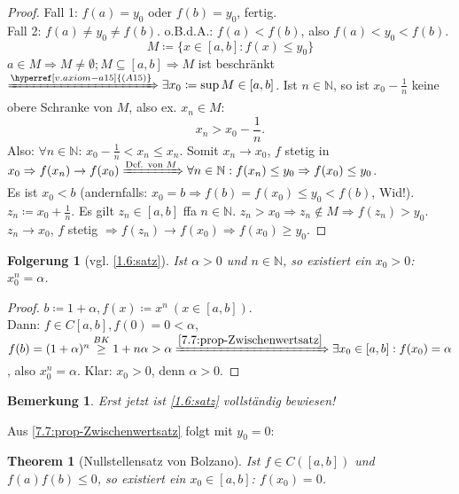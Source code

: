 \documentclass[titlepage,ngerman,a4paper,headsepline]{scrartcl}
\newcommand{\N}{\mathbb{N}}
\theoremstyle{named}
\newtheorem{namedtheorem}{Theorem} \counterwithin{namedtheorem}{section}
\theoremstyle{dotless}
\newtheorem*{bemerkung}{Bemerkung}
\newtheorem*{folgerung*}{Folgerung}
\begin{document}
\begin{proof}
	Fall 1: $f(a) = y_{0}$ oder $f(b) = y_{0}$, fertig. \\
	Fall 2: $f(a) \neq y_{0} \neq f(b)$. o.B.d.A.: $f(a) < f(b)$, also $f(a) < y_{0} < 	f(b)$.
	$$ M \coloneqq \{ x \in [a, b]: f(x) \leq y_{0} \} $$
	$a \in M \Rightarrow M \neq \emptyset; M \subseteq [a, b] \Rightarrow M$ ist beschränkt $\xRightarrow[]{\hyperref[v.axiom-a15]{(A15)}} \exists x_{0} \coloneqq \sup M \in [a, b]$. Ist $n \in \N$, so ist $x_{0} - \frac{1}{n}$ keine obere Schranke von $M$, also ex. $x_{n} \in M$:
		$$ x_{n} > x_{0} - \frac{1}{n}. $$
	Also: $\forall n \in \N$: $x_{0} - \frac{1}{n} < x_{n} \leq x_{n}$. Somit $x_{n} \rightarrow x_{0}$, $f$ stetig in $x_{0} \Rightarrow f(x_{n}) \rightarrow f(x_{0}) \xRightarrow[]{\text{Def. von }M} \forall n \in \N: f(x_{n}) \leq y_{0} \Rightarrow f(x_{0}) \leq y_{0}$. \\
	Es ist $x_{0} < b$ (andernfalls: $x_{0} = b \Rightarrow f(b) = f(x_{0}) \leq y_{0} < f(b)$, Wid!). \\
	$z_{n} \coloneqq x_{0} + \frac{1}{n}$. Es gilt $z_{n} \in [a, b]$ ffa $n \in \N$. $z_{n} > x_{0} \Rightarrow z_{n} \notin M \Rightarrow f(z_{n}) > y_{0}$. $z_{n} \rightarrow x_{0}$, $f$ stetig $\Rightarrow f(z_{n}) \rightarrow f(x_{0}) \Rightarrow f(x_{0}) \geq y_{0}$.
\end{proof}


\begin{folgerung*}[vgl. \ref{1.6:satz}]
	Ist $\alpha > 0$ und $n \in \N$, so existiert ein $x_{0} > 0$: $x_{0}^{n} = \alpha$.	
\end{folgerung*}

\begin{proof}
	$b \coloneqq 1 + \alpha, f(x) \coloneqq x^{n} ~(x \in [a, b])$. \\
	Dann: $f \in C[a, b], f(0) = 0 < \alpha$, $f(b) = (1 + \alpha)^{n} \overset{BK}{\geq} 1 + n \alpha > \alpha \xRightarrow[]{\ref{7.7:prop-Zwischenwertsatz}} \exists x_{0} \in [a, b]: f(x_{0}) = \alpha$, also $x_{0}^{n} = \alpha$. Klar: $x_{0} > 0$, denn $\alpha > 0$.
\end{proof}

\begin{bemerkung}
	Erst jetzt ist \ref{1.6:satz} vollständig bewiesen!
\end{bemerkung}


Aus \ref{7.7:prop-Zwischenwertsatz} folgt mit $y_{0} = 0$:

\begin{namedtheorem}[Nullstellensatz von Bolzano] \label{7.8:prop-NullstellensatzVonBolzano}
	Ist $f \in C\left([a, b]\right)$ und $f(a)f(b) \leq 0$, so existiert ein $x_{0} \in [a, b]$: $f(x_{0}) = 0$.
\end{namedtheorem}
\end{document}

